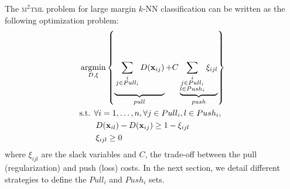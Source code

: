 The \textsc{m$^2$tml} problem for large margin $k$-NN classification can be written as the following optimization problem:
\begin{equation}
\begin{aligned}
&\displaystyle 		\argmin_{D,\xi} \left\lbrace \underbrace{
	\vphantom{ \sum\limits_{\substack{i \\ j \in Pull_i \\ l \in Push_i}}  \xi_{ijl} }
	\sum_{\substack{i \\ j \in Pull_i}}D(\textbf{x}_{ij})
}_{pull}
+ C
\underbrace{
	\sum\limits_{\substack{i \\ j \in Pull_i \\ l \in Push_i}} \xi_{ijl}
}
_{push} \right\rbrace  \\
&\text{s.t.  } \forall i = 1, \ldots, n, \forall j \in Pull_i, l \in Push_i, \\
& \qquad D(\textbf{x}_{il})-D(\textbf{x}_{ij}) \geq 1-\xi_{ijl} \\
& \qquad \xi_{ijl} \geq 0 
\label{eq:OriginalOptimizationProblem_Objective} 
\end{aligned}
\end{equation}
\noindent where $\xi_{ijl}$ are the slack variables and $C$, the trade-off between the pull (regularization) and push (loss) costs. In the next section, we detail different strategies to define the $Pull_i$ and $Push_i$ sets. 



